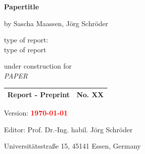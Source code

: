 \begin{center}

\begin{Large}
\bfseries
Papertitle
\end{Large}

\vspace{1.0cm}

{\large by  Sascha Maassen, J\"org Schr\"oder}
\vspace{1.0cm}

type of report:\\
type of report

\vspace{0.5cm}

under construction for \\
\textit{ PAPER }\\

\vfill

{\bfseries{}\renewcommand{\arraystretch}{1.5}%
\begin{tabular}{|c|c|}
\hline
Report - Preprint & No. XX\\
\hline
\end{tabular}}


\vspace{.2cm}

\vspace{0.6cm}
Version: {\bfseries\textcolor{red}\today} 

\vspace{0.6cm}

Editor: Prof. Dr.-Ing. habil. J\"org Schr\"oder

\vspace{0.cm}
{Universit\"atsstra\ss e 15, 45141 Essen, Germany}

\end{center}

\newpage

